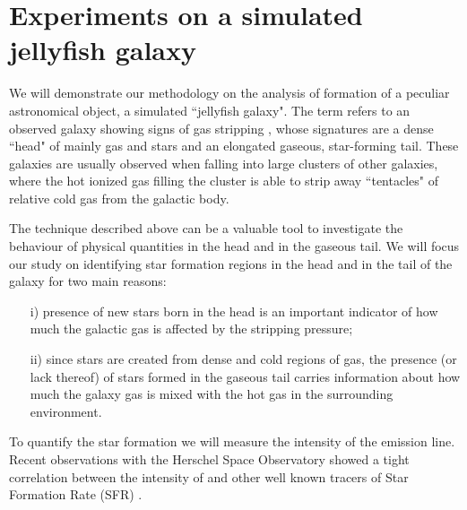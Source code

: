 
\section{Experiments on a simulated jellyfish galaxy}\label{sec:Ex_JellyFish}

We will demonstrate our methodology on the analysis of formation of a peculiar astronomical object, a simulated ``jellyfish galaxy".
The term refers to an observed galaxy showing signs of gas stripping \citep{Poggianti2017a}, whose signatures are a dense ``head" of mainly gas and stars and an elongated gaseous, star-forming tail.
These galaxies are usually observed when falling into large clusters of other galaxies, where the hot ionized gas filling the cluster is able to strip away ``tentacles" of relative cold gas from the galactic body.

The technique described above can be a valuable tool to investigate the behaviour of physical quantities in the head and in the gaseous tail.
We will focus our study on identifying star formation regions in the head and in the tail of the galaxy for two main reasons:
\begin{itemize}
  \item[i)] presence of new stars born in the head is an important indicator of how much the galactic gas is affected by the stripping pressure;
  \item[ii)] since stars are created from dense and cold regions of gas, the presence (or lack thereof) of stars formed in the gaseous tail carries information about how much the galaxy gas is mixed with the hot gas in the surrounding environment.
\end{itemize}
To quantify the star formation we will measure the intensity of the \cii{} emission line.
Recent observations with the Herschel Space Observatory showed a tight correlation between the intensity of \cii{} and other well known tracers of Star Formation Rate (SFR) \citep{DeLooze2011,Herrera-Camus2015}.

